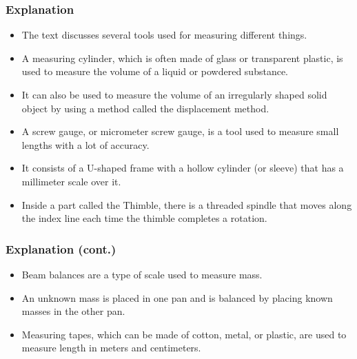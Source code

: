 \documentclass{beamer}
\begin{document}
\immediate{}
\immediate{}
\immediate{}
\immediate{}
\immediate{}
\immediate{}

\begin{frame}
\frametitle{Explanation}
\begin{itemize}
\item The text discusses several tools used for measuring different things. 
\item A measuring cylinder, which is often made of glass or transparent plastic, is used to measure the volume of a liquid or powdered substance. 
\item It can also be used to measure the volume of an irregularly shaped solid object by using a method called the displacement method.
\item A screw gauge, or micrometer screw gauge, is a tool used to measure small lengths with a lot of accuracy. 
\item It consists of a U-shaped frame with a hollow cylinder (or sleeve) that has a millimeter scale over it. 
\item Inside a part called the Thimble, there is a threaded spindle that moves along the index line each time the thimble completes a rotation.
\end{itemize}
\end{frame}

\begin{frame}
\frametitle{Explanation (cont.)}
\begin{itemize}
\item Beam balances are a type of scale used to measure mass. 
\item An unknown mass is placed in one pan and is balanced by placing known masses in the other pan.
\item Measuring tapes, which can be made of cotton, metal, or plastic, are used to measure length in meters and centimeters.
\end{itemize}
\end{frame}
\end{document}
